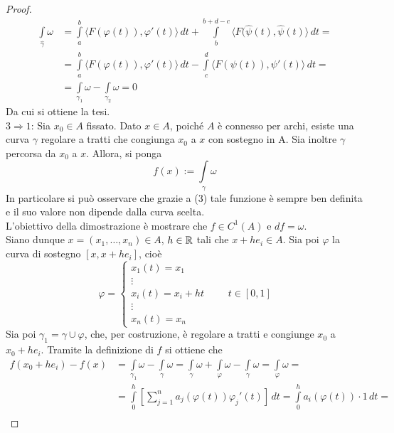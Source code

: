 \begin{proof}
\begin{equation}
\begin{aligned}
\int\limits_{\hat{{\gamma}}}{\omega} &= \int\limits_{a}^{b} \langle F(\varphi(t)), \varphi'(t)\rangle \, dt + \int\limits_{b}^{b+d-c}{\langle F(\hat{\psi}(t), \hat{\psi}(t) \rangle}\, dt=\\ 
&= \int\limits_{a}^{b} \langle F(\varphi(t)), \varphi'(t)\rangle \, dt - \int\limits_{c}^{d}{\langle F(\psi(t)), \psi'(t) \rangle}\, dt =\\
&= \int\limits_{\gamma_1}{\omega} - \int\limits_{\gamma_2}{\omega} = 0
\end{aligned}
\end{equation}
Da cui si ottiene la tesi.\\
$3 \Rightarrow 1$: Sia $x_0 \in A$ fissato. Dato $x \in A$, poiché $A$ è connesso per archi, esiste una curva $\gamma$ regolare a tratti che congiunga $x_0$ a $x$ con sostegno in A. Sia inoltre $\gamma$ percorsa da $x_0$ a $x$. Allora, si ponga
\begin{equation}
    f(x):=\int\limits_{\gamma}{\omega}
\end{equation}
In particolare si può osservare che grazie a (3) tale funzione è sempre ben definita e il suo valore non dipende dalla curva scelta.\\
L'obiettivo della dimostrazione è mostrare che $f \in C^1(A)$ e $df= \omega$.\\
Siano dunque $x=(x_1, \dots, x_n) \in A$, $h \in \mathbb{R}$ tali che $x+he_i \in A$. Sia poi $\varphi$ la curva di sostegno $[x, x+he_i]$, cioè
\begin{equation}
    \varphi= \begin{cases}
        x_1(t)=x_1\\
        \vdots\\
        x_i(t)=x_i+ht\\
        \vdots\\
        x_n(t)=x_n
    \end{cases}
    \qquad t \in [0,1]
\end{equation}
Sia poi $\gamma_1= \gamma \cup \varphi$, che, per costruzione, è regolare a tratti e congiunge $x_0$ a $x_0+he_i$. Tramite la definizione di $f$ si ottiene che
\begin{equation}
\begin{aligned}
    f(x_0+he_i)-f(x)&=\int\limits_{\gamma_1}{\omega}- \int\limits_{\gamma}{\omega}= \int\limits_{\gamma}{\omega}+\int\limits_{\varphi}{\omega}-\int\limits_{\gamma}{\omega}= \int\limits_{\varphi}{\omega}=\\
    &=\int\limits_{0}^{h}{\left[\sum\limits_{j=1}^{n}{a_j(\varphi(t))\varphi_j'(t)} \right] }\, dt=    \int\limits_{0}^{h}{a_i(\varphi(t))\cdot 1}\, dt =\\ 

\end{aligned}
\end{equation}
\end{proof}

